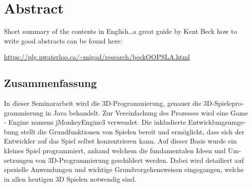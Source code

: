 \begingroup
\let\clearpage\relax
\let\cleardoublepage\relax
\let\cleardoublepage\relax


\ifx\myLanguage\english

\chapter*{Abstract}
Short summary of the contents in English\dots a great guide by 
Kent Beck how to write good abstracts can be found here:  
\begin{center}
\url{https://plg.uwaterloo.ca/~migod/research/beckOOPSLA.html}
\end{center}

\vfill

\fi

\begin{otherlanguage}{ngerman}
\chapter*{Zusammenfassung}
In dieser Seminararbeit wird die 3D-Programmierung, genauer die 3D-Spieleprogrammierung in Java behandelt. Zur Vereinfachung des Prozesses wird eine Game - Engine namens jMonkeyEngine3 verwendet. Die inkludierte Entwicklungsumgebung stellt die Grundfunktionen von Spielen bereit und ermöglicht, dass sich der Entwickler auf das Spiel selbst konzentrieren kann.
Auf dieser Basis wurde ein kleines Spiel programmiert, anhand welchem die fundamentalen Ideen und Umsetzungen von 3D-Programmierung geschildert werden. Dabei wird detailiert auf spezielle Anwendungen und wichtige Grundvorgehensweisen eingegangen, welche in allen heutigen 3D Spielen notwendig sind.

	
\end{otherlanguage}

\endgroup			

\vfill